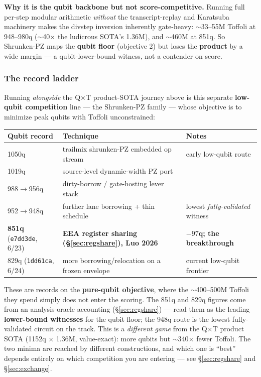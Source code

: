 \documentclass[11pt,a4paper]{article}
\begin{document}
\textbf{Why it is the qubit backbone but not score-competitive.} Running full per-step modular
arithmetic \emph{without} the transcript-replay and Karatsuba machinery makes the divstep inversion
inherently gate-heavy: $\sim$33--55M Toffoli at 948--980q ($\sim$40$\times$ the ludicrous SOTA's
1.36M), and $\sim$460M at 851q. So Shrunken-PZ maps the \textbf{qubit floor} (objective 2) but loses
the \textbf{product} by a wide margin --- a qubit-lower-bound witness, not a contender on score.

\subsubsection{The record ladder}

Running \emph{alongside} the Q$\times$T product-SOTA journey above is this separate \textbf{low-qubit
competition} line --- the Shrunken-PZ family --- whose objective is to minimize peak qubits with
Toffoli unconstrained:

\begin{center}
\begin{tabular}{p{2.6cm}p{6.0cm}p{4.4cm}}
\toprule
\textbf{Qubit record} & \textbf{Technique} & \textbf{Notes} \\
\midrule
1050q & trailmix shrunken-PZ embedded op stream & early low-qubit route \\
1019q & source-level dynamic-width PZ port & \\
988$\to$956q & dirty-borrow / gate-hosting lever stack & \\
952$\to$948q & further lane borrowing + thin schedule & lowest \emph{fully-validated} witness \\
\textbf{851q} (\texttt{e7dd3de}, 6/23) & \textbf{EEA register sharing (\S\ref{sec:regshare}), Luo 2026} & \textbf{$-97$q; the breakthrough} \\
829q (\texttt{1dd61ca}, 6/24) & more borrowing/relocation on a frozen envelope & current low-qubit frontier \\
\bottomrule
\end{tabular}
\end{center}

These are records on the \textbf{pure-qubit objective}, where the $\sim$400--500M Toffoli they spend
simply does not enter the scoring. The 851q and 829q figures come from an analysis-oracle accounting
(\S\ref{sec:regshare}) --- read them as the leading \textbf{lower-bound witnesses} for the qubit
floor; the 948q route is the lowest fully-validated circuit on the track. This is a \emph{different
game} from the Q$\times$T product SOTA (1152q $\times$ 1.36M, value-exact): more qubits but
$\sim$340$\times$ fewer Toffoli. The two minima are reached by different constructions, and which one
is ``best'' depends entirely on which competition you are entering --- see \S\ref{sec:regshare} and
\S\ref{sec:exchange}.
\end{document}
